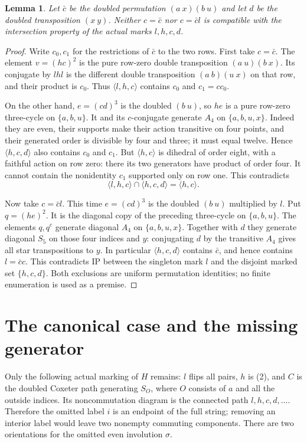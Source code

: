 \documentclass[11pt,a4paper]{article}
\newtheorem{lemma}{Lemma}
\newcommand{\gen}[1]{\langle#1\rangle}
\begin{document}
\begin{lemma}\label{localip}
Let $\bar c$ be the doubled permutation $(a\ x)(b\ u)$ and
let $d$ be the doubled transposition $(x\ y)$. Neither
$c=\bar c$ nor $c=\bar c l$ is compatible with the intersection
property of the actual marks $l,h,c,d$.
\end{lemma}
\begin{proof}
Write $c_0,c_1$ for the restrictions of $\bar c$ to the two rows.
First take $c=\bar c$. The element $v=(hc)^2$ is the pure row-zero
double transposition $(a\ u)(b\ x)$. Its conjugate by $lhl$
is the different double transposition $(a\ b)(u\ x)$ on that
row, and their product is $c_0$. Thus $\gen{l,h,c}$ contains
$c_0$ and $c_1=c c_0$.

On the other hand, $e=(cd)^3$ is the doubled $(b\ u)$, so $he$
is a pure row-zero three-cycle on $\{a,b,u\}$. It and its
$c$-conjugate generate $A_4$ on $\{a,b,u,x\}$. Indeed they
are even, their supports make their action transitive on four
points, and their generated order is divisible by four and three;
it must equal twelve. Hence $\gen{h,c,d}$ also contains $c_0$
and $c_1$. But $\gen{h,c}$ is dihedral of order eight, with a
faithful action on row zero: there its two generators have product
of order four. It cannot contain the nonidentity $c_1$ supported
only on row one. This contradicts
\[
            \gen{l,h,c}\cap\gen{h,c,d}=\gen{h,c}.
\]

Now take $c=\bar c l$. This time $e=(cd)^3$ is the doubled
$(b\ u)$ multiplied by $l$. Put $q=(he)^2$. It is the diagonal
copy of the preceding three-cycle on $\{a,b,u\}$.
The elements $q,q^c$ generate diagonal $A_4$ on
$\{a,b,u,x\}$. Together with $d$ they generate diagonal $S_5$
on those four indices and $y$: conjugating $d$ by the transitive
$A_4$ gives all star transpositions to $y$. In particular
$\gen{h,c,d}$ contains $\bar c$, and hence contains
$l=\bar c c$. This contradicts IP between the singleton mark
$l$ and the disjoint marked set $\{h,c,d\}$. Both exclusions
are uniform permutation identities; no finite enumeration is
used as a premise.
\end{proof}

\section*{The canonical case and the missing generator}
Only the following actual marking of $H$ remains: $l$ flips all
pairs, $h$ is (2), and $C$ is the doubled Coxeter path generating
$S_O$, where $O$ consists of $a$ and all the outside indices.
Its noncommutation diagram is the connected path
$l,h,c,d,\ldots$. Therefore the omitted label $i$ is an endpoint
of the full string; removing an interior label would leave two
nonempty commuting components. There are two orientations for
the omitted even involution $\sigma$.
\end{document}
